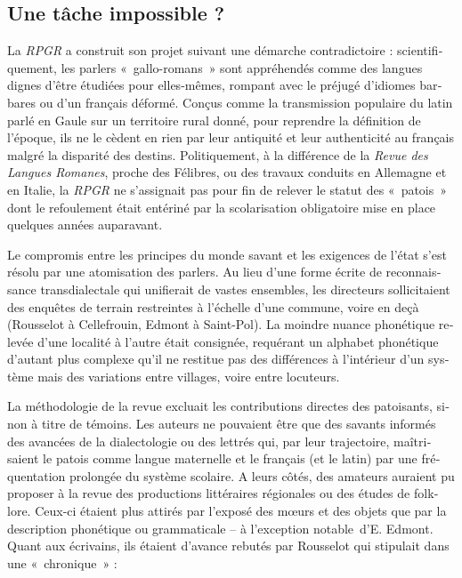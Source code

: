 \documentclass[french,output=paper,colorlinks,citecolor=brown]{../langscibook}
\begin{document}
\begin{otherlanguage}{french}
\section{Une tâche impossible ?}

La \textit{RPGR} a construit son projet suivant une démarche contradictoire : scientifiquement, les parlers «~gallo-romans~» sont appréhendés comme des langues dignes d’être étudiées pour elles-mêmes, rompant avec le préjugé d’idiomes barbares ou d’un français déformé. Conçus comme la transmission populaire du latin parlé en Gaule sur un territoire rural donné, pour reprendre la définition de l’époque, ils ne le cèdent en rien par leur antiquité et leur authenticité au français malgré la disparité des destins. Politiquement, à la différence de la \textit{Revue des Langues Romanes}, proche des Félibres, ou des travaux conduits en Allemagne et en Italie, la \textit{RPGR} ne s’assignait pas pour fin de relever le statut des «~patois~» dont le refoulement était entériné par la scolarisation obligatoire mise en place quelques années auparavant. 

Le compromis entre les principes du monde savant et les exigences de l’état s’est résolu par une atomisation des parlers. Au lieu d’une forme écrite de reconnaissance transdialectale qui unifierait de vastes ensembles, les directeurs sollicitaient des enquêtes de terrain restreintes à l’échelle d’une commune, voire en deçà (Rousselot à Cellefrouin, Edmont à Saint-Pol). La moindre nuance phonétique relevée d’une localité à l’autre était consignée, requérant un alphabet phonétique d’autant plus complexe qu’il ne restitue pas des différences à l’intérieur d’un système mais des variations entre villages, voire entre locuteurs.

La méthodologie de la revue excluait les contributions directes des patoisants, sinon à titre de témoins. Les auteurs ne pouvaient être que des savants informés des avancées de la dialectologie ou des lettrés qui, par leur trajectoire, maîtrisaient le patois comme langue maternelle et le français (et le latin) par une fréquentation prolongée du système scolaire. A leurs côtés, des amateurs auraient pu proposer à la revue des productions littéraires régionales ou des études de folklore. Ceux-ci étaient plus attirés par l’exposé des mœurs et des objets que par la description phonétique ou grammaticale – à l’exception notable~d’E. Edmont. Quant aux écrivains, ils étaient d’avance rebutés par Rousselot qui stipulait dans une «~chronique~» :


\end{otherlanguage}
\end{document}
